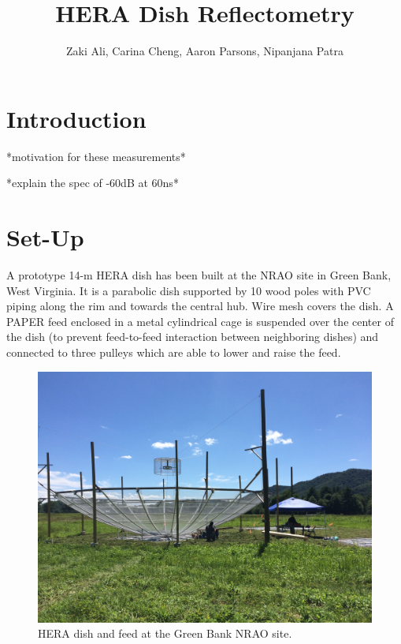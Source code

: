 \documentclass[12pt,preprint]{aastex}
\begin{document}
\title{HERA Dish Reflectometry} 
\author{Zaki Ali, Carina Cheng, Aaron Parsons, Nipanjana Patra}
\maketitle

\section{Introduction}

*motivation for these measurements*

*explain the spec of -60dB at 60ns*

\section{Set-Up}

A prototype 14-m HERA dish has been built at the NRAO site in Green Bank, West Virginia. It is a parabolic dish supported by 10 wood poles with PVC piping along the rim and towards the central hub. Wire mesh covers the dish. A PAPER feed enclosed in a metal cylindrical cage is suspended over the center of the dish (to prevent feed-to-feed interaction between neighboring dishes) and connected to three pulleys which are able to lower and raise the feed. 

\begin{figure}[H]
\centering
\includegraphics[trim={2cm 20cm 30cm 15cm},clip, totalheight=0.45\textheight]{plots/heradish.jpg}
\caption{HERA dish and feed at the Green Bank NRAO site.}
\end{figure}
\end{document}
